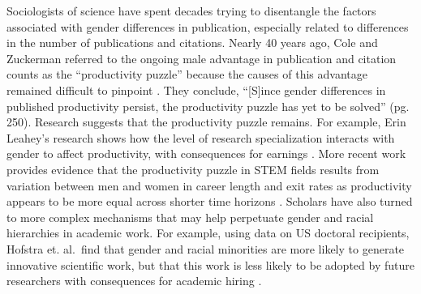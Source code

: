 \documentclass[
  10pt,
  letterpaper,
]{article}
\begin{document}
Sociologists of science have spent decades trying to disentangle the
factors associated with gender differences in publication, especially
related to differences in the number of publications and citations.
Nearly 40 years ago, Cole and Zuckerman referred to the ongoing male
advantage in publication and citation counts as the ``productivity
puzzle'' because the causes of this advantage remained difficult to
pinpoint \citep{cole_productivity_1984}. They conclude, ``{[}S{]}ince
gender differences in published productivity persist, the productivity
puzzle has yet to be solved'' (pg. 250). Research suggests that the
productivity puzzle remains. For example, Erin Leahey's research shows
how the level of research specialization interacts with gender to affect
productivity, with consequences for earnings
\citep{leahey_gender_2006, leahey_not_2007}. More recent work provides
evidence that the productivity puzzle in STEM fields results from
variation between men and women in career length and exit rates as
productivity appears to be more equal across shorter time horizons
\citep{huang_historical_2020}. Scholars have also turned to more complex
mechanisms that may help perpetuate gender and racial hierarchies in
academic work. For example, using data on US doctoral recipients,
Hofstra et. al.~find that gender and racial minorities are more likely
to generate innovative scientific work, but that this work is less
likely to be adopted by future researchers with consequences for
academic hiring \citep{hofstra_diversity_2020}.
\end{document}

